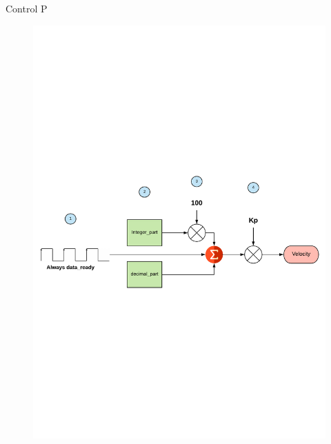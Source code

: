 \documentclass{beamer}
\begin{document}
\begin{frame}{Control P}
		\begin{figure}[H]
		\center
		\includegraphics[trim = 0cm 7cm 0mm 7cm, clip,scale=0.5]{imagenes/Balancing_robot/P.pdf}
		\end{figure}
\end{frame}
\end{document}
